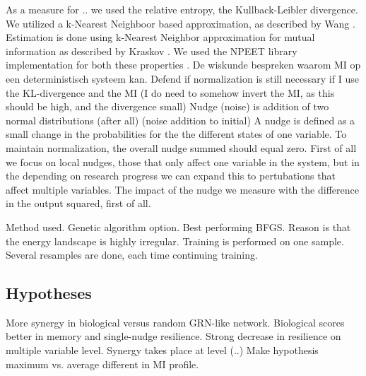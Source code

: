 \documentclass[../main.tex]{subfiles}
\begin{document}


As a measure for .. we used the relative entropy, the Kullback-Leibler divergence.
We utilized a k-Nearest Neighboor based approximation, as described by Wang \cite{wang2009divergence}.
Estimation is done using k-Nearest Neighbor approximation for mutual information as described by Kraskov \cite{kraskov2004estimating}.
We used the NPEET library implementation for both these properties \cite{versteeg2013NPEET}.
De wiskunde bespreken waarom MI op een deterministisch systeem kan.
Defend if normalization is still necessary if I use the KL-divergence and the MI (I do need to somehow invert the MI, as this should be high, and the divergence small)
Nudge (noise) is addition of two normal distributions (after all) (noise addition to initial)
A nudge is defined as a small change in the probabilities for the the different states of one variable. To maintain normalization, the overall nudge summed should equal zero.
First of all we focus on local nudges, those that only affect one variable in the system, but in the depending on research progress we can expand this to pertubations that affect multiple variables. 
The impact of the nudge we measure with the difference in the output squared, first of all.


Method used.
Genetic algorithm option.
Best performing BFGS.
Reason is that the energy landscape is highly irregular.
Training is performed on one sample.
Several resamples are done, each time continuing training.

\subsection{Hypotheses}

More synergy in biological versus random GRN-like network.
Biological scores better in memory and single-nudge resilience.
Strong decrease in resilience on multiple variable level.
Synergy takes place at level (..)
Make hypothesis maximum vs. average different in MI profile.
\end{document}
